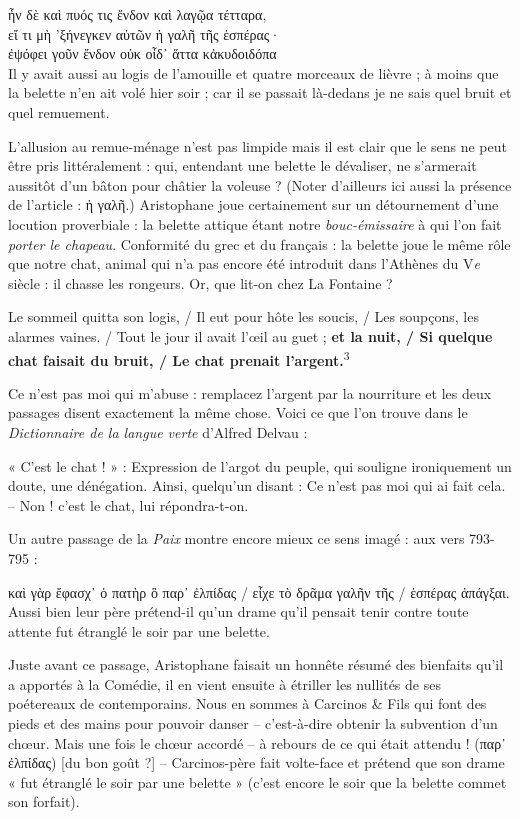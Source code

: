 \documentclass[12pt]{book}%
\newcommand{\italique}[1]{\textit{#1}}%
\newcommand{\citComm}[1]{\begin{quoting}[vskip=0pt] #1 \end{quoting}}%
\newcommand{\nieme}[1]{#1\italique{e}}%
\newcommand{\marqueur}[1]{\textsuperscript{#1}}%
\newenvironment{groupe}{%
\pstart%
\ledgroup%
}{%
\pend %
}%
\begin{document}
\begin{pages}
\begin{Leftside}
\begin{groupe}
{{\citComm{ἦν δὲ καὶ πυός τις ἔνδον καὶ λαγῷα τέτταρα,\\
εἴ τι μὴ 'ξήνεγκεν αὐτῶν ἡ γαλῆ τῆς ἑσπέρας·\\
ἐψόφει γοῦν ἔνδον οὐκ οἶδ᾽ ἅττα κἀκυδοιδόπα\\
Il y avait aussi au logis de l'amouille et quatre morceaux de lièvre ; 
à moins que la belette n'en ait volé hier soir ; 
car il se passait là-dedans je ne sais quel bruit et quel remuement.}%
L'allusion au remue-ménage n'est pas limpide mais il est clair que le sens ne peut être pris littéralement : qui, entendant une belette le dévaliser, ne s'armerait aussitôt d'un bâton pour châtier la voleuse ? (Noter d'ailleurs ici aussi la présence de l'article : ἡ γαλῆ.) 
Aristophane joue certainement sur un détournement d'une locution proverbiale : la belette attique étant notre \italique{bouc-émissaire} à qui l'on fait \italique{porter le chapeau}. 
Conformité du grec et du français : la belette joue le même rôle que notre chat, animal qui n'a pas encore été introduit dans l'Athènes du \nieme{V} siècle : il chasse les rongeurs. Or, que lit-on chez La Fontaine ?%
\citComm{Le sommeil quitta son logis, /
Il eut pour hôte les soucis, /
Les soupçons, les alarmes vaines. / 
Tout le jour il avait l'œil au guet ; \textbf{et la nuit, /
Si quelque chat faisait du bruit, /
Le chat prenait l'argent.}\marqueur{3}}%
Ce n'est pas moi qui m'abuse : remplacez l'argent par la nourriture et les deux passages disent exactement la même chose.
Voici ce que l'on trouve dans le \italique{Dictionnaire de la langue verte} d'Alfred Delvau :%
\citComm{« C'est le chat ! » : Expression de l'argot du peuple, qui souligne ironiquement un doute, une dénégation. Ainsi, quelqu'un disant : Ce n'est pas moi qui ai fait cela. – Non ! c'est le chat, lui répondra-t-on.}%
Un autre passage de la \italique{Paix} montre encore mieux ce sens imagé : aux vers 793-795 :%
\citComm{καὶ γὰρ ἔφασχ᾽ ὁ πατὴρ ὃ παρ᾽ ἐλπίδας /
εἶχε τὸ δρᾶμα γαλῆν τῆς /
ἑσπέρας ἀπάγξαι.\\
Aussi bien leur père prétend-il qu'un drame qu'il pensait tenir contre toute attente fut étranglé le soir par une belette.}%
Juste avant ce passage, Aristophane faisait un honnête résumé des bienfaits qu'il a apportés à la Comédie, il en vient ensuite à étriller les nullités de ses poétereaux de contemporains. Nous en sommes à Carcinos \& Fils qui font des pieds et des mains pour pouvoir danser – c'est-à-dire obtenir la subvention d'un chœur.
Mais une fois le chœur accordé – à rebours de ce qui était attendu ! (παρ᾽ ἐλπίδας) [du bon goût ?] – Carcinos-père fait volte-face et prétend que son drame « fut étranglé le soir par une belette » (c'est encore le soir que la belette commet son forfait). 
}}
\end{groupe}
\end{Leftside}
\end{pages}
\end{document}
